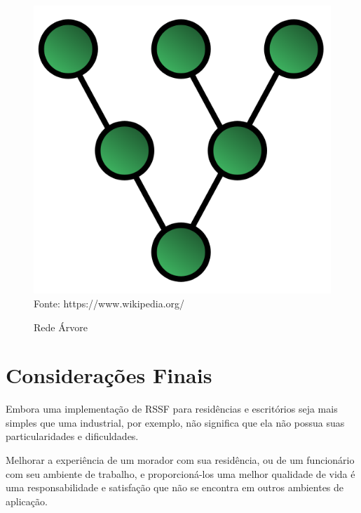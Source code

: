 \begin{figure}[H]
	\caption{Rede Árvore}
	\centering
	\includegraphics[scale=0.25]{../images/tree.png}
	\hspace{\linewidth}
	Fonte: https://www.wikipedia.org/
	\label{figura:tree}
\end{figure}

\section{Considerações Finais}
Embora uma implementação de RSSF para residências e escritórios seja mais simples que uma industrial, por
exemplo, não significa que ela não possua suas particularidades e dificuldades.

Melhorar a experiência de um morador com sua residência, ou de um funcionário com seu ambiente de trabalho, e
proporcioná-los uma melhor qualidade de vida é uma responsabilidade e satisfação que não se encontra em outros
ambientes de aplicação.
